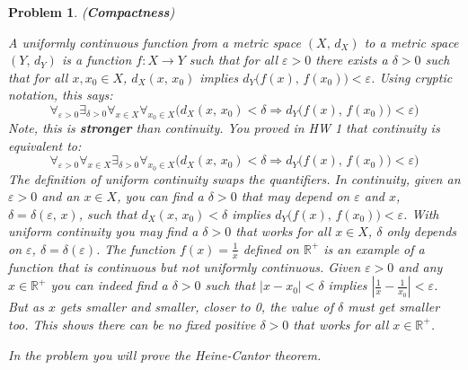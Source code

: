 \documentclass{article}
\theoremstyle{normal}
\newtheorem{problem}{Problem}
\begin{document}
    \begin{problem}
        (\textbf{Compactness})
        \par\hfil\par
        A uniformly continuous function from a metric space
        $(X,\,d_{X})$ to a metric space $(Y,\,d_{Y})$ is a function
        $f:X\rightarrow{Y}$ such that for all $\varepsilon>0$ there exists
        a $\delta>0$ such that for all $x,x_{0}\in{X}$,
        $d_{X}(x,\,x_{0})$ implies $d_{Y}\big(f(x),\,f(x_{0})\big)<\varepsilon$.
        Using cryptic notation, this says:
        \begin{equation}
            \forall_{\varepsilon>0}\exists_{\delta>0}
                \forall_{x\in{X}}\forall_{x_{0}\in{X}}
                    \Big(d_{X}(x,\,x_{0})<\delta
                    \Rightarrow{d}_{Y}\big(f(x),\,f(x_{0})\big)<\varepsilon\Big)
        \end{equation}
        Note, this is \textbf{stronger} than continuity. You proved in HW 1
        that continuity is equivalent to:
        \begin{equation}
            \forall_{\varepsilon>0}\forall_{x\in{X}}\exists_{\delta>0}
                \forall_{x_{0}\in{X}}\Big(d_{X}(x,\,x_{0})<\delta
                    \Rightarrow{d}_{Y}\big(f(x),\,f(x_{0})\big)<\varepsilon\Big)
        \end{equation}
        The definition of uniform continuity \textit{swaps the quantifiers}.
        In continuity, given an $\varepsilon>0$ and an $x\in{X}$, you can
        find a $\delta>0$ that may depend on $\varepsilon$ and $x$,
        $\delta=\delta(\varepsilon,\,x)$, such that
        $d_{X}(x,\,x_{0})<\delta$ implies
        $d_{Y}\big(f(x),\,f(x_{0})\big)<\varepsilon$. With uniform continuity
        you may find a $\delta>0$ that works for all $x\in{X}$,
        $\delta$ only depends on $\varepsilon$, $\delta=\delta(\varepsilon)$.
        The function $f(x)=\frac{1}{x}$ defined on $\mathbb{R}^{+}$ is an
        example of a function that is continuous but not uniformly continuous.
        Given $\varepsilon>0$ and any $x\in\mathbb{R}^{+}$ you can indeed find
        a $\delta>0$ such that $|x-x_{0}|<\delta$ implies
        $|\frac{1}{x}-\frac{1}{x_{0}}|<\varepsilon$. But as $x$ gets smaller and
        smaller, closer to 0, the value of $\delta$ must get smaller too. This
        shows there can be no fixed positive $\delta>0$ that works for all
        $x\in\mathbb{R}^{+}$.
        \par\hfill\par
        In the problem you will prove the \textit{Heine-Cantor theorem}.

\end{problem}
\end{document}
